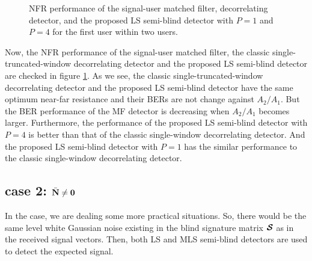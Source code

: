 \documentclass[a4paper,11pt,fleqn]{article}
\newcommand{\bN}{{\bf N}}
\newcommand{\bcS}{{\mbox {\boldmath ${\cal S}$}}}
\begin{document}
\begin{figure}
\caption{NFR performance of the signal-user matched filter,
decorrelating detector, and the proposed LS semi-blind detector
with $P=1$ and $P=4$ for the first user within two users.}
\label{NFR0}
\end{figure}

Now, the NFR performance of the signal-user matched filter, the
classic single-truncated-window decorrelating detector and the
proposed LS semi-blind detector are checked in figure \ref{NFR0}.
As we see, the classic single-truncated-window decorrelating
detector and the proposed LS semi-blind detector have the same
optimum near-far resistance and their BERs are not change against
$A_2/A_1$. But the BER performance of the MF detector is
decreasing when $A_2/A_1$ becomes larger. Furthermore, the
performance of the proposed LS semi-blind detector with $P=4$ is
better than that of the classic single-window decorrelating
detector. And the proposed LS semi-blind detector with $P=1$ has
the similar performance to the classic single-window decorrelating
detector.

\subsection*{case 2: $\bar{\bN} \neq \mathbf{0}$}

In the case, we are dealing some more practical situations. So,
there would be the same level white Gaussian noise existing in the
blind signature matrix $\bcS$ as in the received signal vectors.
Then, both LS and MLS semi-blind detectors are used to detect the
expected signal.
\end{document}
